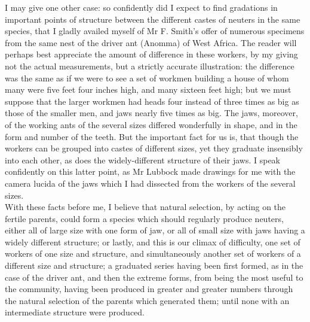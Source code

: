 \indent I may give one other case: so confidently did I expect to find gradations in important points of structure between the different castes of neuters in the same species, that I gladly availed myself of Mr F. Smith's offer of numerous specimens from the same nest of the driver ant (Anomma) of West Africa. The reader will perhaps best appreciate the amount of difference in these workers, by my giving not the actual measurements, but a strictly accurate illustration: the difference was the same as if we were to see a set of workmen building a house of whom many were five feet four inches high, and many sixteen feet high; but we must suppose that the larger workmen had heads four instead of three times as big as those of the smaller men, and jaws nearly five times as big. The jaws, moreover, of the working ants of the several sizes differed wonderfully in shape, and in the form and number of the teeth. But the important fact for us is, that though the workers can be grouped into castes of different sizes, yet they graduate insensibly into each other, as does the widely-different structure of their jaws.  I speak confidently on this latter point, as Mr Lubbock made drawings for me with the camera lucida of the jaws which I had dissected from the workers of the several sizes.\\
\indent With these facts before me, I believe that natural selection, by acting on the fertile parents, could form a species which should regularly produce neuters, either all of large size with one form of jaw, or all of small size with jaws having a widely different structure; or lastly, and this is our climax of difficulty, one set of workers of one size and structure, and simultaneously another set of workers of a different size and structure; a graduated series having been first formed, as in the case of the driver ant, and then the extreme forms, from being the most useful to the community, having been produced in greater and greater numbers through the natural selection of the parents which generated them; until none with an intermediate structure were produced.\\
